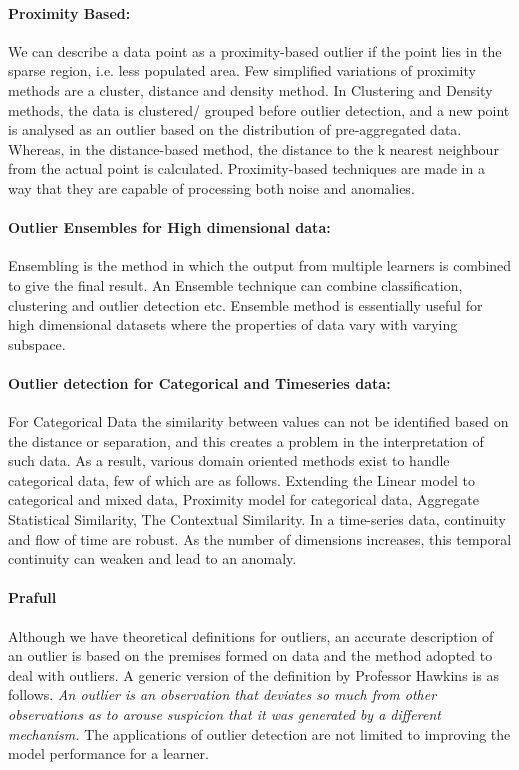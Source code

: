 \documentclass[runningheads]{llncs}
\begin{document}
\paragraph*{Proximity Based:} We can describe a data point as a proximity-based outlier if the point lies in the sparse region, i.e. less populated area. Few simplified variations of proximity methods are a cluster, distance and density method. In Clustering and Density methods, the data is clustered/ grouped before outlier detection, and a new point is analysed as an outlier based on the distribution of pre-aggregated data. Whereas, in the distance-based method, the distance to the k nearest neighbour from the actual point is calculated. Proximity-based techniques are made in a way that they are capable of processing both noise and anomalies.
\paragraph*{Outlier Ensembles for High dimensional data:} Ensembling is the method in which the output from multiple learners is combined to give the final result. An Ensemble technique can combine classification, clustering and outlier detection etc. Ensemble method is essentially useful for high dimensional datasets where the properties of data vary with varying subspace.
\paragraph*{Outlier detection for Categorical and Timeseries data:} For Categorical Data the similarity between values can not be identified based on the distance or separation, and this creates a problem in the interpretation of such data. As a result, various domain oriented methods exist to handle categorical data, few of which are as follows. Extending the Linear model to categorical and mixed data, Proximity model for categorical data, Aggregate Statistical Similarity, The Contextual Similarity. In a time-series data, continuity and flow of time are robust. As the number of dimensions increases, this temporal continuity can weaken and lead to an anomaly.

\paragraph{Prafull} Although we have theoretical definitions for outliers, an accurate description of an outlier is based on the premises formed on data and the method adopted to deal with outliers. A generic version of the definition by Professor Hawkins is as follows. \textit{An outlier is an observation that deviates so much from other observations as to arouse suspicion that it was generated by a different mechanism.
} The applications of outlier detection are not limited to improving the model performance for a learner. 
\end{document}
